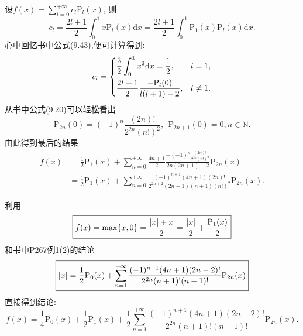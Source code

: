 \begin{yySolution}
	设$f(x) = \sum_{l = 0}^{+\infty}c_l\mathrm{P}_l(x)$, 则
	\begin{equation*}
		c_l = \frac{2l+1}{2}\int_{0}^{1}x\mathrm{P}_l(x)\mathrm{d}x = \frac{2l+1}{2}\int_{0}^{1}\mathrm{P}_1(x)\mathrm{P}_l(x)\mathrm{d}x.
	\end{equation*}
	心中回忆书中公式(9.43),便可计算得到:
	\begin{equation*}
		c_l = \begin{dcases}
			\frac{3}{2}\int_{0}^{1}x^2\mathrm{d}x = \frac{1}{2}, &l = 1,\\
			\frac{2l+1}{2}\frac{-\mathrm{P}_l(0)}{l(l+1)-2},&l\neq 1.
		\end{dcases}
	\end{equation*}
	从书中公式(9.20)可以轻松看出\begin{equation*}
		\mathrm{P}_{2n}(0) = (-1)^n\frac{(2n)!}{2^{2n}(n!)^2},~~\mathrm{P}_{2n+1}(0) = 0, n\in\mathbb{N}.
	\end{equation*}
	由此得到最后的结果\begin{equation*}
		\begin{split}
			f(x) &= \frac{1}{2}\mathrm{P}_1(x) + \sum_{n = 0}^{+\infty}\frac{4n+1}{2}\frac{-(-1)^n\frac{(2n)!}{2^{2n}(n!)^2}}{2n(2n+1)-2}\mathrm{P}_{2n}(x) \\
			&= \frac{1}{2}\mathrm{P}_1(x)+\sum_{n = 0}^{+\infty}\frac{(-1)^{n+1}(4n+1)(2n)!}{2^{2n+2}(2n-1)(n+1)(n!)^2}\mathrm{P}_{2n}(x).
		\end{split}
	\end{equation*}
\end{yySolution}

\begin{yySolution2}
	利用\begin{equation*}
		\boxed{f(x) = \max\{x,0\} = \frac{\lvert x\rvert+x}{2} = \frac{\lvert x\rvert}{2} + \frac{\mathrm{P}_1(x)}{2}}
	\end{equation*}
	和书中P267例1(2)的结论
	\begin{equation*}
		\boxed{
			\lvert x\rvert = \frac{1}{2}\mathrm{P}_0(x) + \sum_{n = 1}^{+\infty}\frac{(-1)^{n+1}(4n+1)(2n-2)!}{2^{2n}(n+1)!(n-1)!}\mathrm{P}_{2n}(x)
		}
	\end{equation*}
	直接得到结论:
	\begin{equation*}
		f(x) = \frac{1}{4}\mathrm{P}_0(x)+\frac{1}{2}\mathrm{P}_1(x) +\frac{1}{2}\sum_{n = 1}^{+\infty}\frac{(-1)^{n+1}(4n+1)(2n-2)!}{2^{2n}(n+1)!(n-1)!}\mathrm{P}_{2n}(x).
	\end{equation*}
\end{yySolution2}

